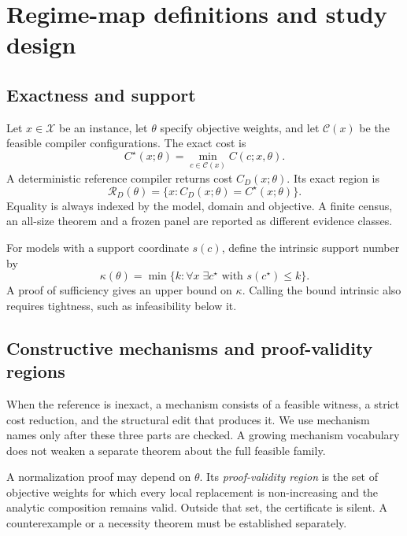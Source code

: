 \section{Regime-map definitions and study design}

\subsection{Exactness and support}

Let $x\in\mathcal{X}$ be an instance, let $\theta$ specify objective weights, and let $\mathcal{C}(x)$ be the feasible compiler configurations.  The exact cost is
\begin{equation}
 C^\star(x;\theta)=\min_{c\in\mathcal{C}(x)} C(c;x,\theta).
\end{equation}
A deterministic reference compiler returns cost $C_D(x;\theta)$.  Its exact region is
\begin{equation}
 \mathcal{R}_D(\theta)=\{x:C_D(x;\theta)=C^\star(x;\theta)\}.
\end{equation}
Equality is always indexed by the model, domain and objective.  A finite census, an all-size theorem and a frozen panel are reported as different evidence classes.

For models with a support coordinate $s(c)$, define the intrinsic support number by
\begin{equation}
 \kappa(\theta)=\min\{k:\forall x\;\exists c^\star\text{ with }s(c^\star)\leq k\}.
\end{equation}
A proof of sufficiency gives an upper bound on $\kappa$.  Calling the bound intrinsic also requires tightness, such as infeasibility below it.

\subsection{Constructive mechanisms and proof-validity regions}

When the reference is inexact, a mechanism consists of a feasible witness, a strict cost reduction, and the structural edit that produces it.  We use mechanism names only after these three parts are checked.  A growing mechanism vocabulary does not weaken a separate theorem about the full feasible family.

A normalization proof may depend on $\theta$.  Its \emph{proof-validity region} is the set of objective weights for which every local replacement is non-increasing and the analytic composition remains valid.  Outside that set, the certificate is silent.  A counterexample or a necessity theorem must be established separately.

